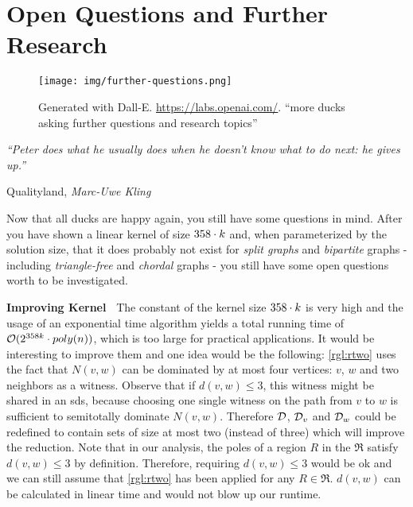 \chapter{Open Questions and Further Research}\label{ch:closing}

\vspace*{-50pt}

\begin{figure}[ht]
        \texttt{[image: img/further-questions.png]}
        \captionsetup{textformat=empty,labelformat=blank}
        \caption[Generated with Dalle-E. Knowledge Cutoff 09-2022]{Generated with Dall-E. \url{https://labs.openai.com/}. ``more ducks asking further questions and research topics''}
\end{figure}

\epigraph{\itshape ``Peter does what he usually does when he doesn’t know what to do next: he gives up.''}{Qualityland, \textit{Marc-Uwe Kling}}

Now that all ducks are happy again, you still have some questions in mind.
After you have shown a linear kernel of size $358 \cdot k$ and, when parameterized by the solution size, that it does probably not exist for \textit{split graphs} and \textit{bipartite} graphs - including \textit{triangle-free} and \textit{chordal} graphs - you still have some open questions worth to be investigated.


\noindent \textbf{Improving Kernel~}
The constant of the kernel size $358 \cdot k$ is very high and the usage of an exponential time algorithm yields a total running time of  $\mathcal{O}(2^{358 k} \cdot poly(n))$, which is too large for practical applications.
It would be interesting to improve them and one idea would be the following:
\cref{rgl:rtwo} uses the fact that $N(v,w)$ can be dominated by at most four vertices: $v$, $w$ and two neighbors as a witness.
Observe that if $d(v,w) \leq 3$, this witness might be shared in an sds, because choosing one single witness on the path from $v$ to $w$ is sufficient to semitotally dominate $N(v,w)$.
Therefore $\mathcal{D}$, $\mathcal{D}_{v}$ and $\mathcal{D}_{w}$ could be redefined to contain sets of size at most two (instead of three) which will improve the reduction. 
Note that in our analysis, the poles of a region $R$ in the \dreg $\mathfrak{R}$ satisfy $d(v,w) \leq 3$ by definition.
Therefore, requiring $d(v,w) \leq 3$ would be ok and we can still assume that \cref{rgl:rtwo} has been applied for any $R \in \mathfrak{R}$.
$d(v,w)$ can be calculated in linear time and would not blow up our runtime.


